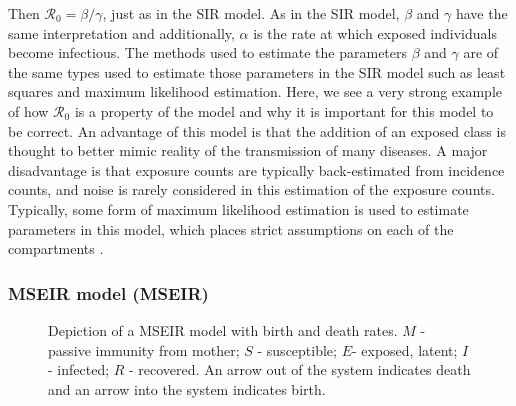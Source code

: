 \documentclass[12pt]{article}
\newcommand{\rr}{\ensuremath{\mathcal{R}_0}}
\begin{document}
Then $\rr = \beta / \gamma$, just as in the SIR model.  As in the SIR model, $\beta$ and $\gamma$ have the same interpretation and additionally, $\alpha$ is the rate at which exposed individuals become infectious.  The methods used to estimate the parameters $\beta$ and $\gamma$ are of the same types used to estimate those parameters in the SIR model such as least squares and maximum likelihood estimation.  Here, we see a very strong example of how $\rr$ is a property of the model and why it is important for this model to be correct.  An advantage of this model is that the addition of an exposed class is thought to better mimic reality of the transmission of many diseases.  A major disadvantage is that exposure counts are typically back-estimated from incidence counts, and noise is rarely considered in this estimation of the exposure counts.   Typically, some form of maximum likelihood estimation is used to estimate parameters in this model, which places strict assumptions on each of the compartments \citep{althaus2014}.

\subsubsection{MSEIR model (MSEIR)}
\label{sec:mseir-model-mseir}

\begin{figure}[h]
\centering
{}
\caption{Depiction of a MSEIR model with birth and death rates.  $M$ - passive immunity from mother; $S$ - susceptible; $E$- exposed, latent; $I$- infected; $R$ - recovered.  An arrow out of the system indicates death and an arrow into the system indicates birth.}\label{fig::mseir}
\end{figure}
\end{document}
